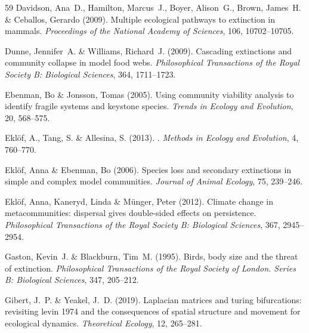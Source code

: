 \documentclass[11pt]{article}
\begin{document}
\begin{thebibliography}{59}
Davidson, Ana~D., Hamilton, Marcus~J., Boyer, Alison~G., Brown, James~H. \&
  Ceballos, Gerardo (2009).
\newblock Multiple ecological pathways to extinction in mammals.
\newblock \emph{Proceedings of the National Academy of Sciences}, 106,
  10702--10705.

Dunne, Jennifer~A. \& Williams, Richard~J. (2009).
\newblock Cascading extinctions and community collapse in model food webs.
\newblock \emph{Philosophical Transactions of the Royal Society B: Biological
  Sciences}, 364, 1711--1723.

Ebenman, Bo \& Jonsson, Tomas (2005).
\newblock Using community viability analysis to identify fragile systems and
  keystone species.
\newblock \emph{Trends in Ecology and Evolution}, 20, 568--575.

Ekl\"{o}f, A., Tang, S. \& Allesina, S. (2013).
.
\newblock \emph{Methods in Ecology and Evolution}, 4, 760--770.

Eklöf, Anna \& Ebenman, Bo (2006).
\newblock Species loss and secondary extinctions in simple and complex model
  communities.
\newblock \emph{Journal of Animal Ecology}, 75, 239--246.

Eklöf, Anna, Kaneryd, Linda \& Münger, Peter (2012).
\newblock Climate change in metacommunities: dispersal gives double-sided
  effects on persistence.
\newblock \emph{Philosophical Transactions of the Royal Society B: Biological
  Sciences}, 367, 2945--2954.

Gaston, Kevin~J. \& Blackburn, Tim~M. (1995).
\newblock Birds, body size and the threat of extinction.
\newblock \emph{Philosophical Transactions of the Royal Society of London.
  Series B: Biological Sciences}, 347, 205--212.

Gibert, J.~P. \& Yeakel, J.~D. (2019).
\newblock Laplacian matrices and turing bifurcations: revisiting levin 1974 and
  the consequences of spatial structure and movement for ecological dynamics.
\newblock \emph{Theoretical Ecology}, 12, 265--281.


\end{thebibliography}
\end{document}
